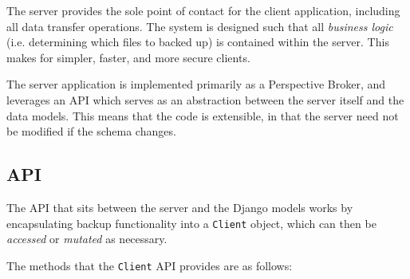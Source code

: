The server provides the sole point of contact for the client application,
including all data transfer operations. The system is designed such that all
\emph{business logic} (i.e. determining which files to backed up) is contained
within the server. This makes for simpler, faster, and more secure clients.

The server application is implemented primarily as a Perspective Broker, and
leverages an API which serves as an abstraction between the server itself and
the data models. This means that the code is extensible, in that the server
need not be modified if the schema changes.

\subsection{API}

The API that sits between the server and the Django models works by
encapsulating backup functionality into a \verb!Client! object, which can then
be \emph{accessed} or \emph{mutated} as necessary.

The methods that the \verb!Client! API provides are as follows:

